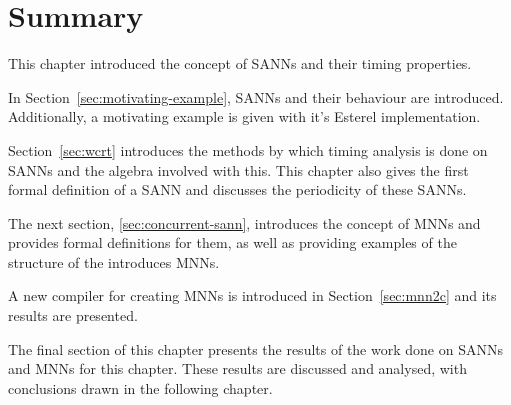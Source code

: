 \section{Summary}
This chapter introduced the concept of \acfp{SANN} and their timing properties.

In Section~\ref{sec:motivating-example}, \acp{SANN} and their behaviour are introduced. 
Additionally, a motivating example is given with it's Esterel implementation.

Section~\ref{sec:wcrt} introduces the methods by which timing analysis is done on \acp{SANN} and the algebra involved with this.
This chapter also gives the first formal definition of a \ac{SANN} and discusses the periodicity of these \acp{SANN}.

The next section, \ref{sec:concurrent-sann}, introduces the concept of \acfp{MNN} and provides formal definitions for them, as well as providing examples of the structure of the introduces \acp{MNN}.

A new compiler for creating \acp{MNN} is introduced in Section~\ref{sec:mnn2c} and its results are presented.

The final section of this chapter presents the results of the work done on \acp{SANN} and \acp{MNN} for this chapter.
These results are discussed and analysed, with conclusions drawn in the following chapter.
